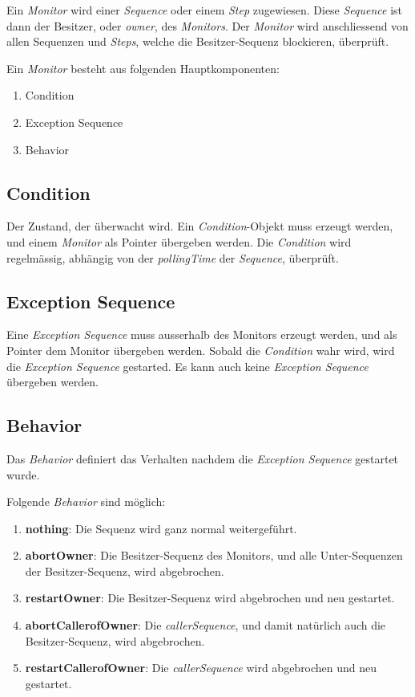 Ein \textit{Monitor} wird einer \textit{Sequence} oder einem \textit{Step} zugewiesen.
Diese \textit{Sequence} ist dann der Besitzer, oder \textit{owner}, des \textit{Monitors}.
Der \textit{Monitor} wird anschliessend von allen Sequenzen und \textit{Steps}, welche die Besitzer-Sequenz blockieren, überprüft.

Ein \textit{Monitor} besteht aus folgenden Hauptkomponenten:
\begin{enumerate}
\item Condition 
\item Exception Sequence
\item Behavior
\end{enumerate}

\subsection{Condition}
Der Zustand, der überwacht wird.
Ein \textit{Condition}-Objekt muss erzeugt werden, und einem \textit{Monitor} als Pointer übergeben werden.
Die \textit{Condition} wird regelmässig, abhängig von der \textit{pollingTime} der \textit{Sequence}, überprüft.


\subsection{Exception Sequence}
Eine \textit{Exception Sequence} muss ausserhalb des Monitors erzeugt werden, und als Pointer dem Monitor übergeben werden.
Sobald die \textit{Condition} wahr wird, wird die \textit{Exception Sequence} gestarted.
Es kann auch keine \textit{Exception Sequence} übergeben werden.

\subsection{Behavior}
Das \textit{Behavior} definiert das Verhalten nachdem die \textit{Exception Sequence} gestartet wurde.

Folgende \textit{Behavior} sind möglich:
\begin{enumerate}
\item \textbf{nothing}: Die Sequenz wird ganz normal weitergeführt.
\item \textbf{abortOwner}: Die Besitzer-Sequenz des Monitors, und alle Unter-Sequenzen der Besitzer-Sequenz, wird abgebrochen.
\item \textbf{restartOwner}: Die Besitzer-Sequenz wird abgebrochen und neu gestartet.
\item \textbf{abortCallerofOwner}: Die \textit{callerSequence}, und damit natürlich auch die Besitzer-Sequenz, wird abgebrochen.
\item \textbf{restartCallerofOwner}: Die \textit{callerSequence} wird abgebrochen und neu gestartet.
\end{enumerate}



